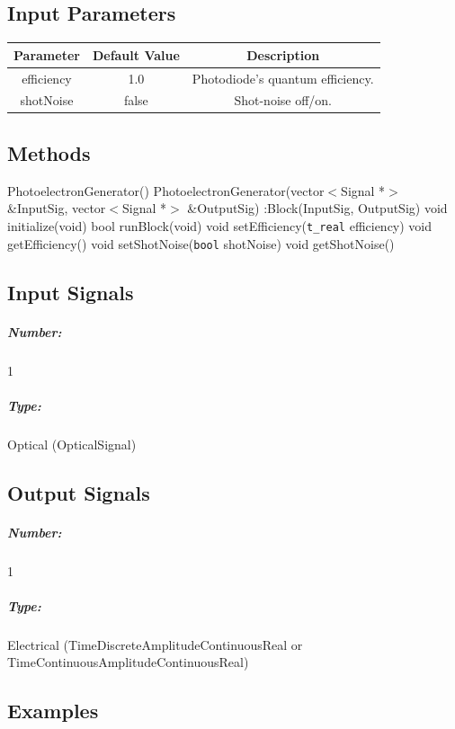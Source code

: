 \begin{refsection}
\subsection*{Input Parameters}

\begin{table}[H]
	\centering
	\label{my-label}
	\begin{tabular}{|c|c|c|}
		\hline
		\textbf{Parameter}	& \textbf{Default Value}	& \textbf{Description} \\
		\hline
		efficiency			& 1.0						& Photodiode's quantum efficiency. \\
		\hline
		shotNoise			& false 					& Shot-noise off/on. \\
		\hline
	\end{tabular}
\end{table}




\subsection*{Methods}

PhotoelectronGenerator()
\bigbreak
PhotoelectronGenerator(vector$<$Signal *$>$ \&InputSig, vector$<$Signal *$>$ \&OutputSig) :Block(InputSig, OutputSig) {}
\bigbreak
void initialize(void)
\bigbreak
bool runBlock(void)
\bigbreak
void setEfficiency(\texttt{t\_real} efficiency)
\bigbreak
void getEfficiency()
\bigbreak
void setShotNoise(\texttt{bool} shotNoise)
\bigbreak
void getShotNoise()
%
%
%
%
\pagebreak

\subsection*{Input Signals}

\subparagraph*{Number:} 1

\subparagraph*{Type:} Optical (OpticalSignal)

\subsection*{Output Signals}

\subparagraph*{Number:} 1

\subparagraph*{Type:} Electrical (TimeDiscreteAmplitudeContinuousReal or TimeContinuousAmplitudeContinuousReal)

\subsection*{Examples}


\end{refsection}
